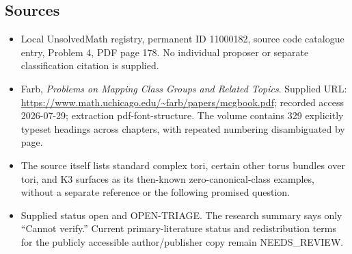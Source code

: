 \documentclass[11pt]{article}
\begin{document}
\subsection{Sources}
\begin{itemize}
\item Local UnsolvedMath registry, permanent ID 11000182, source code catalogue entry, Problem 4, PDF page 178. No individual proposer or separate classification citation is supplied.
\item Farb, \emph{Problems on Mapping Class Groups and Related Topics}. Supplied URL: \url{https://www.math.uchicago.edu/~farb/papers/mcgbook.pdf}; recorded access 2026-07-29; extraction pdf-font-structure. The volume contains 329 explicitly typeset headings across chapters, with repeated numbering disambiguated by page.
\item The source itself lists standard complex tori, certain other torus bundles over tori, and K3 surfaces as its then-known zero-canonical-class examples, without a separate reference or the following promised question.
\item Supplied status open and OPEN-TRIAGE. The research summary says only ``Cannot verify.'' Current primary-literature status and redistribution terms for the publicly accessible author/publisher copy remain NEEDS\_REVIEW.
\end{itemize}
\end{document}
